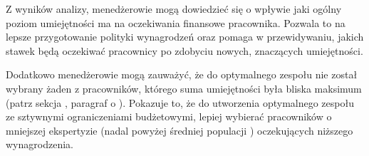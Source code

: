 \par Z wyników analizy, menedżerowie mogą dowiedzieć się o wpływie jaki ogólny poziom umiejętności ma na oczekiwania finansowe pracownika. Pozwala to na lepsze przygotowanie polityki wynagrodzeń oraz pomaga w przewidywaniu, jakich stawek będą oczekiwać pracownicy po zdobyciu nowych, znaczących umiejętności.

\par Dodatkowo menedżerowie mogą zauważyć, że do optymalnego zespołu nie został wybrany żaden z pracowników, którego suma umiejętności była bliska maksimum (patrz sekcja , paragraf o ). Pokazuje to, że do utworzenia optymalnego zespołu ze sztywnymi ograniczeniami budżetowymi, lepiej wybierać pracowników o mniejszej ekspertyzie (nadal powyżej średniej populacji ) oczekujących niższego wynagrodzenia.
